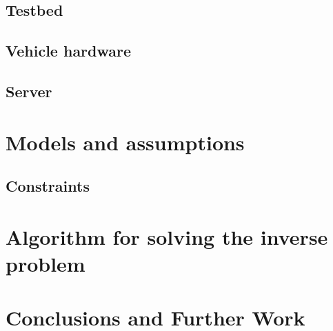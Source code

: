 \documentclass[english]{article}\usepackage[]{graphicx}\usepackage[]{color}
\begin{document}
\subsection{Testbed}
\subsection{Vehicle hardware}
\subsection{Server}
\begin{comment}
Description of testbed, hardware, software, logic
Sid's flowchart
\end{comment}

\section{Models and assumptions}
\subsection{Constraints}
\begin{comment}
Description of constraints for our problem
limited bandwidth, data storage
Also assumptions about simple piecewise environments
\end{comment}

\section{Algorithm for solving the inverse problem}
\begin{comment}
\end{comment}
\section{Conclusions and Further Work}
\end{document}
